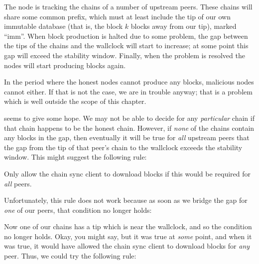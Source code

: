 \pagebreak

The node is tracking the chains of a number of upstream peers. These chains will
share some common prefix, which must at least include the tip of our own
immutable database (that is, the block $k$ blocks away from our tip), marked
``imm''. When block production is halted due to some problem, the gap between
the tips of the chains and the wallclock will start to increase; at some point
this gap will exceed the stability window. Finally, when the problem is resolved
the nodes will start producing blocks again.

\begin{assumption}
\label{never-only-malicious}
In the period where the honest nodes cannot produce any blocks, malicious nodes
cannot either. If that is not the case, we are in trouble anyway; that is a
problem which is well outside the scope of this chapter.
\end{assumption}

 seems to give some hope. We may not be able to
decide for any \emph{particular} chain if that chain happens to be the honest
chain. However, if \emph{none} of the chains contain any blocks in the gap, then
eventually it will be true for \emph{all} upstream peers that the gap from the
tip of that peer's chain to the wallclock exceeds the stability window. This
might suggest the following rule:

\begin{failedattempt}
Only allow the chain sync client to download blocks if this would be required
for \emph{all} peers.
\end{failedattempt}

Unfortunately, this rule does not work because as soon as we bridge the gap for
\emph{one} of our peers, that condition no longer holds:
%
\begin{center}
\end{center}
%
Now one of our chains has a tip which is near the wallclock, and so the
condition no longer holds. Okay, you might say, but it was true at \emph{some}
point, and when it was true, it would have allowed the chain sync client to
download blocks for \emph{any} peer. Thus, we could try the following rule:

